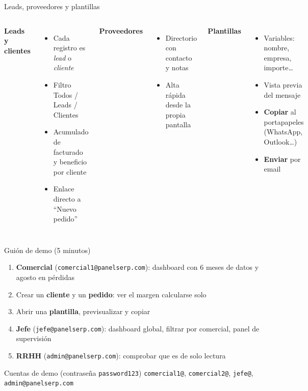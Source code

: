 \documentclass[aspectratio=169,11pt]{beamer}
\begin{document}
\begin{frame}{Leads, proveedores y plantillas}
  \begin{columns}[T]
    \textbf{\color{brand}Leads y clientes}
    \begin{itemize}\small
      \item Cada registro es \emph{lead} o \emph{cliente}
      \item Filtro Todos / Leads / Clientes
      \item Acumulado de facturado y beneficio por cliente
      \item Enlace directo a ``Nuevo pedido''
    \end{itemize}
    \textbf{\color{brand}Proveedores}
    \begin{itemize}\small
      \item Directorio con contacto y notas
      \item Alta r\'apida desde la propia pantalla
    \end{itemize}
    \textbf{\color{brand}Plantillas}
    \begin{itemize}\small
      \item Variables: nombre, empresa, importe\ldots
      \item Vista previa del mensaje
      \item \textbf{Copiar} al portapapeles (WhatsApp, Outlook\ldots)
      \item \textbf{Enviar} por email
    \end{itemize}
  \end{columns}
\end{frame}

\begin{frame}{Gui\'on de demo (5 minutos)}
  \small
  \begin{enumerate}
    \item \textbf{Comercial} (\texttt{comercial1@panelserp.com}): dashboard con 6 meses de datos y agosto en p\'erdidas
    \item Crear un \textbf{cliente} y un \textbf{pedido}: ver el margen calcularse solo
    \item Abrir una \textbf{plantilla}, previsualizar y copiar
    \item \textbf{Jefe} (\texttt{jefe@panelserp.com}): dashboard global, filtrar por comercial, panel de supervisi\'on
    \item \textbf{RRHH} (\texttt{admin@panelserp.com}): comprobar que es de solo lectura
  \end{enumerate}
  \vspace{4pt}
  \begin{block}{Cuentas de demo (contrase\~na \texttt{password123})}
    \texttt{comercial1@}, \texttt{comercial2@}, \texttt{jefe@}, \texttt{admin@}\texttt{panelserp.com}
  \end{block}
\end{frame}
\end{document}
